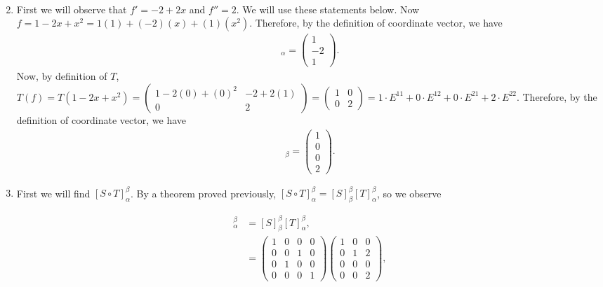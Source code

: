 \documentclass[12pt,answers]{exam}
\begin{document}
\begin{solution}
\begin{enumerate}[label=\roman*)]
\begin{align*}
\end{align*} 
\item First we will observe that $f'=-2+2x$ and $f''=2$. We will use these statements below. Now $f=1-2x+x^2=1(1)+(-2)(x)+(1)(x^2)$. Therefore, by the definition of coordinate vector, we have
\begin{align*}
    [f]_{\alpha}=\begin{pmatrix} 1 \\ -2 \\ 1\end{pmatrix}.
\end{align*}
Now, by definition of $T$, $T(f)=T(1-2x+x^2)=\begin{pmatrix} 1-2(0)+(0)^2 & -2+2(1) \\ 0 & 2 \end{pmatrix}=\begin{pmatrix} 1 & 0 \\ 0 & 2 \end{pmatrix}=1\cdot E^{11}+0\cdot E^{12}+0\cdot E^{21}+2\cdot E^{22}$. Therefore, by the definition of coordinate vector, we have
\begin{align*}
    [T(f)]_{\beta}=\begin{pmatrix} 1 \\ 0 \\ 0 \\ 2\end{pmatrix}.
\end{align*}
\item First we will find $[S\circ T]^{\beta}_{\alpha}$. By a theorem proved previously, $[S\circ T]^{\beta}_{\alpha}=[S]^{\beta}_{\beta}[T]^{\beta}_{\alpha}$, so we observe
\begin{footnotesize}
\begin{align*}
    [S\circ T]^{\beta}_{\alpha}&=[S]^{\beta}_{\beta}[T]^{\beta}_{\alpha}, \\
    &=\begin{pmatrix} 1 & 0 & 0 & 0 \\
                      0 & 0 & 1 & 0 \\
                      0 & 1 & 0 & 0 \\
                      0 & 0 & 0 & 1 \end{pmatrix}
      \begin{pmatrix} 1 & 0 & 0 \\
                      0 & 1 & 2 \\
                      0 & 0 & 0 \\
                      0 & 0 & 2 \end{pmatrix},\\

\end{align*}
\end{footnotesize}
\end{enumerate}
\end{solution}
\end{document}
